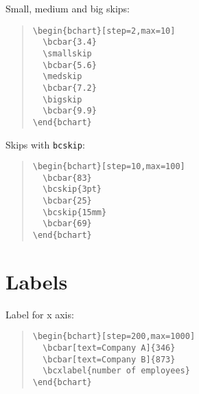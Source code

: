\documentclass{article}
\begin{document}
Small, medium and big skips:
\begin{quote}\small
\begin{verbatim}
\begin{bchart}[step=2,max=10]
  \bcbar{3.4}
  \smallskip
  \bcbar{5.6}
  \medskip
  \bcbar{7.2}
  \bigskip
  \bcbar{9.9}
\end{bchart}
\end{verbatim}
\end{quote}
\begin{quote}
\begin{bchart}[step=2,max=10]
  \smallskip
  \medskip
  \bigskip
\end{bchart}
\end{quote}
Skips with \texttt{bcskip}:
\begin{quote}\small
\begin{verbatim}
\begin{bchart}[step=10,max=100]
  \bcbar{83}
  \bcskip{3pt}
  \bcbar{25}
  \bcskip{15mm}
  \bcbar{69}
\end{bchart}
\end{verbatim}
\end{quote}
\begin{quote}
\begin{bchart}[step=10,max=100]
  \bcskip{3pt}
  \bcskip{15mm}
\end{bchart}
\end{quote}


\section{Labels}

Label for x axis:
\begin{quote}\small
\begin{verbatim}
\begin{bchart}[step=200,max=1000]
  \bcbar[text=Company A]{346}
  \bcbar[text=Company B]{873}
  \bcxlabel{number of employees}
\end{bchart}
\end{verbatim}
\end{quote}
\begin{quote}
\begin{bchart}[step=200,max=1000]
\end{bchart}
\end{quote}
\end{document}
